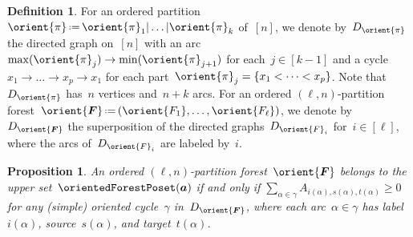 \documentclass{amsart}
\newtheorem{proposition}[theorem]{Proposition}
\theoremstyle{definition}
\newtheorem{definition}[theorem]{Definition}
\renewcommand{\b}[1]{{\boldsymbol{#1}}} %
\newcommand{\eqdef}{\mbox{\,\raisebox{0.2ex}{\scriptsize\ensuremath{\mathrm:}}\ensuremath{=}\,}} %
\renewcommand{\b}[1]{\boldsymbol{#1}} %
\begin{document}
\begin{definition}
For an ordered partition~$\orient{\pi} \eqdef \orient{\pi}_1 | \dots | \orient{\pi}_k$ of~$[n]$, we denote by~$D_{\orient{\pi}}$ the directed graph on~$[n]$ with an arc~$\max(\orient{\pi}_j) \to \min(\orient{\pi}_{j+1})$ for each~$j \in [k-1]$ and a cycle~${x_1 \to \dots \to x_p \to x_1}$ for each part~$\orient{\pi}_j = \{x_1 < \dots < x_p\}$.
Note that~$D_{\orient{\pi}}$ has~$n$ vertices and~$n + k$ arcs.
For an ordered $(\ell,n)$-partition forest~$\orient{\b{F}} \eqdef (\orient{F_1}, \dots, \orient{F_\ell})$, we denote by~$D_{\orient{\b{F}}}$ the superposition of the directed graphs~$D_{\orient{F}_i}$ for~$i \in [\ell]$, where the arcs of~$D_{\orient{F}_i}$ are labeled by~$i$.
\end{definition}

\begin{proposition}
\label{prop:characterizationOPFs}
An ordered $(\ell,n)$-partition forest~$\orient{\b{F}}$ belongs to the upper set~$\orientedForestPoset(\b{a})$ if and only if $\sum_{\alpha \in \gamma} A_{i(\alpha), s(\alpha), t(\alpha)} \ge 0$ for any (simple) oriented cycle~$\gamma$ in~$D_{\orient{\b{F}}}$, where each arc~$\alpha \in \gamma$ has label~$i(\alpha)$, source~$s(\alpha)$, and target~$t(\alpha)$.
\end{proposition}
\end{document}
